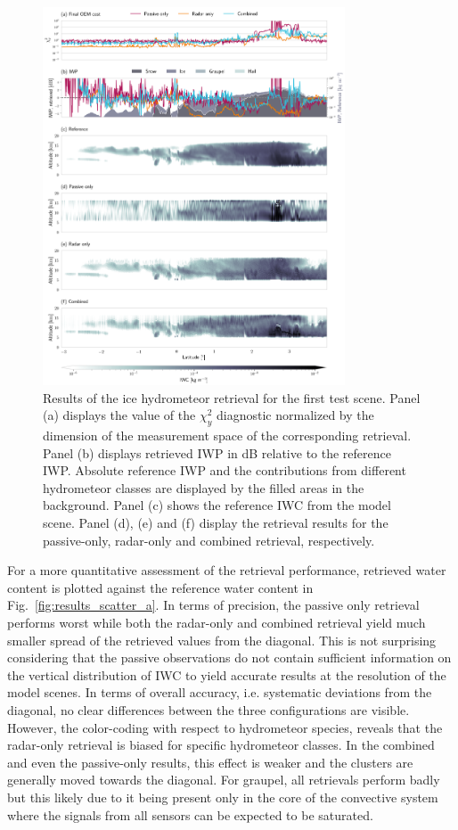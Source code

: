 \documentclass[journal abbreviation, manuscript]{copernicus}
\begin{document}
\begin{figure}
\centering
\includegraphics[width = 0.8\textwidth]{../plots/results_a_LargePlateAggregate}
\caption{Results of the ice hydrometeor retrieval for the first test scene.
  Panel (a) displays the value of the $\chi^2_y$ diagnostic normalized by the
  dimension of the measurement space of the corresponding retrieval. Panel (b)
  displays retrieved IWP in dB relative to the reference IWP. Absolute
  reference IWP and the contributions from different hydrometeor classes are
  displayed by the filled areas in the background. Panel (c) shows
  the reference IWC from the model scene. Panel (d), (e) and (f) display the
  retrieval results for the passive-only, radar-only and combined retrieval,
  respectively.}
\label{fig:results_a}
\end{figure}

For a more quantitative assessment of the retrieval performance, retrieved water
content is plotted against the reference water content in
Fig.~\ref{fig:results_scatter_a}. In terms of precision, the passive only
retrieval performs worst while both the radar-only and combined retrieval yield
much smaller spread of the retrieved values from the diagonal. This is not
surprising considering that the passive observations do not contain sufficient
information on the vertical distribution of IWC to yield accurate results at the
resolution of the model scenes. In terms of overall accuracy, i.e. systematic
deviations from the diagonal, no clear differences between the three
configurations are visible. However, the color-coding with respect to
hydrometeor species, reveals that the radar-only retrieval is biased for
specific hydrometeor classes. In the combined and even the passive-only results,
this effect is weaker and the clusters are generally moved towards the diagonal.
For graupel, all retrievals perform badly but this likely due to it being
present only in the core of the convective system where the signals from all
sensors can be expected to be saturated.
\end{document}
